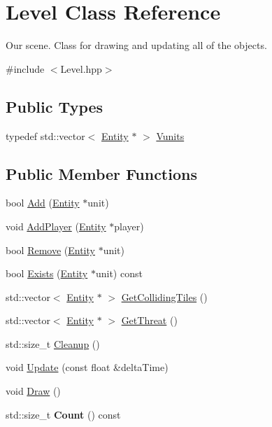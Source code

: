 \hypertarget{class_level}{}\section{Level Class Reference}
\label{class_level}


Our scene. Class for drawing and updating all of the objects.  




{\ttfamily \#include $<$Level.\+hpp$>$}

\subsection*{Public Types}
\begin{DoxyCompactItemize}
\item 
typedef std\+::vector$<$ \mbox{\hyperlink{class_entity}{Entity}} $\ast$ $>$ \mbox{\hyperlink{class_level_a015a1fa25ecf592918309b2d06e5784b}{Vunits}}
\end{DoxyCompactItemize}
\subsection*{Public Member Functions}
\begin{DoxyCompactItemize}
\item 
bool \mbox{\hyperlink{class_level_a3c6eeec185ecf58fbc2022b281896b50}{Add}} (\mbox{\hyperlink{class_entity}{Entity}} $\ast$unit)
\item 
void \mbox{\hyperlink{class_level_a72720ce01a5cd1774f66520ffa33128e}{Add\+Player}} (\mbox{\hyperlink{class_entity}{Entity}} $\ast$player)
\item 
bool \mbox{\hyperlink{class_level_a30421d6ae3d5d0c71e2bca97a6b34901}{Remove}} (\mbox{\hyperlink{class_entity}{Entity}} $\ast$unit)
\item 
bool \mbox{\hyperlink{class_level_a196a92ceea866e88e829ebf589e76589}{Exists}} (\mbox{\hyperlink{class_entity}{Entity}} $\ast$unit) const
\item 
std\+::vector$<$ \mbox{\hyperlink{class_entity}{Entity}} $\ast$ $>$ \mbox{\hyperlink{class_level_a028dcbbb085a3d587fcd3ac14eddb103}{Get\+Colliding\+Tiles}} ()
\item 
std\+::vector$<$ \mbox{\hyperlink{class_entity}{Entity}} $\ast$ $>$ \mbox{\hyperlink{class_level_a5eff8099cd1bd25d3f40286956ddbf9a}{Get\+Threat}} ()
\item 
std\+::size\+\_\+t \mbox{\hyperlink{class_level_a61e1568c2c8677cb735f58a4808e485c}{Cleanup}} ()
\item 
void \mbox{\hyperlink{class_level_ae3eae8009b9fb300ca1cc6e55c998898}{Update}} (const float \&delta\+Time)
\item 
void \mbox{\hyperlink{class_level_adcfeec8d835d60b02018308dffa7cfd7}{Draw}} ()
\item 
\mbox{\label{class_level_a5412024aa775a5a463fd585a9d42e64d}} 
std\+::size\+\_\+t {\bfseries Count} () const
\end{DoxyCompactItemize}
